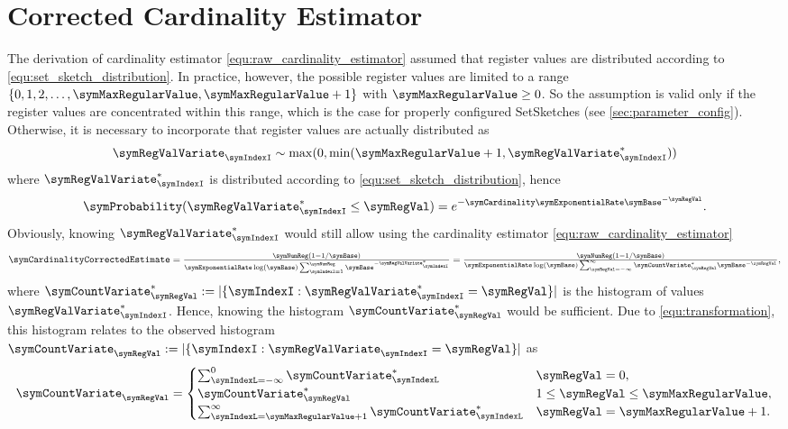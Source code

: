 \documentclass[sigconf, nonacm]{acmart}
\begin{document}
\section{Corrected Cardinality Estimator}
\label{sec:corrected_cardinality_estimator}
The derivation of cardinality estimator \eqref{equ:raw_cardinality_estimator} assumed that register values are distributed according to \eqref{equ:set_sketch_distribution}.
In practice, however, the possible register values are limited to a range $\lbrace 0,1,2,\ldots,\symMaxRegularValue, \symMaxRegularValue+1\rbrace$ with $\symMaxRegularValue\geq 0$. So the assumption is valid only if the register values are concentrated within this range, which is the case for properly configured SetSketches (see \cref{sec:parameter_config}). 
Otherwise, it is necessary to incorporate that register values are actually distributed as 
\begin{equation}
\label{equ:transformation}
\symRegValVariate_\symIndexI\sim\max(0,\min(\symMaxRegularValue+1, \symRegValVariate^{*}_\symIndexI))
\end{equation}
where $\symRegValVariate^{*}_\symIndexI$ is distributed according to \eqref{equ:set_sketch_distribution}, hence
\begin{equation}
\label{equ:distx}
\symProbability(\symRegValVariate^{*}_\symIndexI \leq \symRegVal) = e^{-\symCardinality\symExponentialRate \symBase^{-\symRegVal}}.
\end{equation}
Obviously, knowing $\symRegValVariate^{*}_\symIndexI$ would still allow using the cardinality estimator \eqref{equ:raw_cardinality_estimator}
\begin{equation}
\label{equ:card_est}
\textstyle\symCardinalityCorrectedEstimate
=
\frac{\symNumReg(1-1/\symBase)}{\symExponentialRate\log(\symBase)\sum_{\symIndexI=1}^\symNumReg  \symBase^{-\symRegValVariate^{*}_\symIndexI}}
=
\frac{\symNumReg(1-1/\symBase)}{\symExponentialRate\log(\symBase)\sum_{\symRegVal=-\infty}^{\infty} \symCountVariate^{*}_\symRegVal \symBase^{-\symRegVal}},
\end{equation}
where $\symCountVariate^{*}_\symRegVal := |\lbrace \symIndexI : \symRegValVariate^{*}_\symIndexI = \symRegVal\rbrace|$ is the histogram of values $ \symRegValVariate^{*}_\symIndexI$. Hence, knowing the histogram $\symCountVariate^{*}_\symRegVal$ would be sufficient. Due to \eqref{equ:transformation}, this histogram relates to the observed histogram  $\symCountVariate_\symRegVal := |\lbrace \symIndexI : \symRegValVariate_\symIndexI = \symRegVal\rbrace|$ as
\begin{equation}
\label{equ:histogram_relation}
\symCountVariate_\symRegVal = 
\begin{cases}
\sum_{\symIndexL=-\infty}^0 \symCountVariate^{*}_\symIndexL & \symRegVal = 0,\\
\symCountVariate^{*}_\symRegVal & 1 \leq \symRegVal \leq \symMaxRegularValue,\\
\sum_{\symIndexL=\symMaxRegularValue + 1}^\infty \symCountVariate^{*}_\symIndexL & \symRegVal = \symMaxRegularValue + 1.
\end{cases}
\end{equation}
\end{document}
